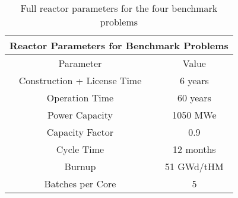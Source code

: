 \begin{table}
  \centering
  \footnotesize{
    \begin{tabular}{|c|c|}
      \multicolumn{2}{c}{\textbf{Reactor Parameters for Benchmark Problems}}\\
      \hline
      Parameter                   & Value \\
      \hline
      Construction + License Time & 6 years \\
      Operation Time              & 60 years \\
      Power Capacity              & 1050 MWe \\
      Capacity Factor             & 0.9 \\ 
      Cycle Time                  & 12 months \\
      Burnup                      & 51 GWd/tHM \\
      Batches per Core            & 5 \\
      \hline
    \end{tabular}
    \caption[Reactor Parameters]{Full reactor parameters for the four benchmark problems}
    \label{tab:parameters}
  }
\end{table}

